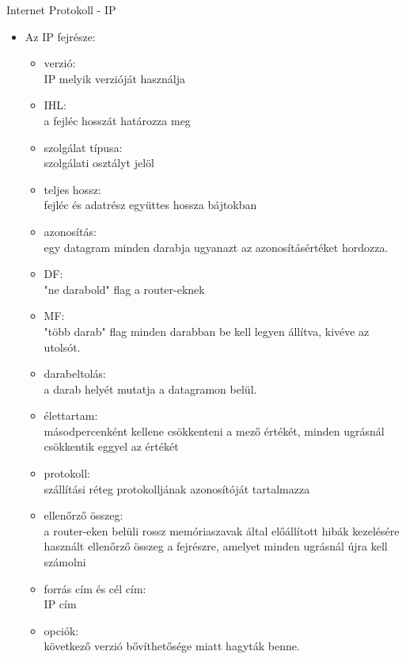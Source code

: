 \documentclass[margin=0px]{article}
\begin{document}
\begin{description}
				Internet Protokoll - IP
					\begin{itemize}
						\item Az IP fejrésze:
							\begin{itemize}
								\item verzió:\\
								IP melyik verzióját használja
								\item IHL: \\
								a fejléc hosszát határozza meg
								\item szolgálat típusa: \\
								szolgálati osztályt jelöl
								\item teljes hossz: \\
								fejléc és adatrész együttes hossza bájtokban
								\item azonosítás: \\
								egy datagram minden darabja ugyanazt az azonosításértéket hordozza.
								\item DF: \\
								"ne darabold" flag a router-eknek
								\item MF: \\
								"több darab" flag minden darabban be kell legyen állítva, kivéve az utolsót.
								\item darabeltolás: \\
								a darab helyét mutatja a datagramon belül.
								\item élettartam: \\
								másodpercenként kellene csökkenteni a mező értékét, minden ugrásnál csökkentik eggyel az értékét
								\item protokoll: \\
								szállítási réteg protokolljának azonosítóját tartalmazza
								\item ellenőrző összeg: \\
								a router-eken belüli rossz memóriaszavak által előállított hibák kezelésére használt ellenőrző összeg a fejrészre, amelyet minden ugrásnál újra kell számolni
								\item forrás cím és cél cím: \\
								IP cím
								\item opciók: \\
								következő verzió bővíthetősége miatt hagyták benne.
							\end{itemize}
							

\end{itemize}
\end{description}
\end{document}
